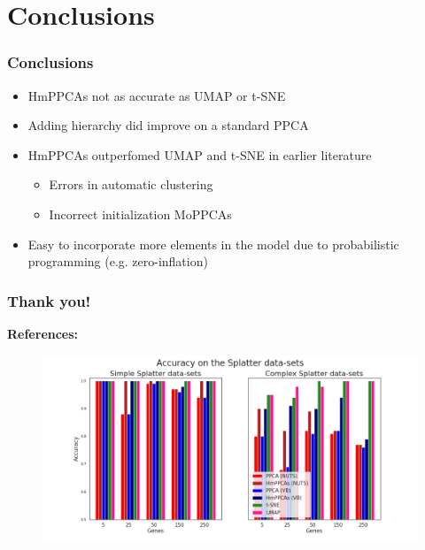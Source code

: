 \documentclass{beamer}
\begin{document}

\section{Conclusions}

\begin{frame}
\frametitle{Conclusions}
\begin{itemize}
    \item HmPPCAs not as accurate as UMAP or t-SNE
    \item Adding hierarchy did improve on a standard PPCA
    \item HmPPCAs outperfomed UMAP and t-SNE in earlier literature
    \begin{itemize}
        \item Errors in automatic clustering
        \item Incorrect initialization MoPPCAs
    \end{itemize}
    \item Easy to incorporate more elements in the model due to probabilistic programming (e.g. zero-inflation)
\end{itemize}
\end{frame}

\appendix

\begin{frame}[shrink=20]

\frametitle{Thank you!}
\textbf{References:}
\footnotesize




\end{frame}


\begin{frame}

\begin{figure}
    \centering
    \includegraphics[width=\linewidth]{Splatter_Accuracy_all.png}
\end{figure}

\end{frame}
\end{document}
